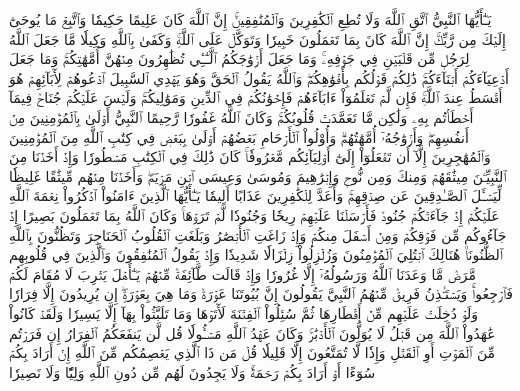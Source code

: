 يَـٰٓأَيُّهَا ٱلنَّبِيُّ ٱتَّقِ ٱللَّهَ وَلَا تُطِعِ ٱلۡكَٰفِرِينَ وَٱلۡمُنَٰفِقِينَۚ إِنَّ ٱللَّهَ كَانَ عَلِيمًا حَكِيمٗا
وَٱتَّبِعۡ مَا يُوحَىٰٓ إِلَيۡكَ مِن رَّبِّكَۚ إِنَّ ٱللَّهَ كَانَ بِمَا تَعۡمَلُونَ خَبِيرٗا
وَتَوَكَّلۡ عَلَى ٱللَّهِۚ وَكَفَىٰ بِٱللَّهِ وَكِيلٗا
مَّا جَعَلَ ٱللَّهُ لِرَجُلٖ مِّن قَلۡبَيۡنِ فِي جَوۡفِهِۦۚ وَمَا جَعَلَ أَزۡوَٰجَكُمُ ٱلَّـٰٓـِٔي تُظَٰهِرُونَ مِنۡهُنَّ أُمَّهَٰتِكُمۡۚ وَمَا جَعَلَ أَدۡعِيَآءَكُمۡ أَبۡنَآءَكُمۡۚ ذَٰلِكُمۡ قَوۡلُكُم بِأَفۡوَٰهِكُمۡۖ وَٱللَّهُ يَقُولُ ٱلۡحَقَّ وَهُوَ يَهۡدِي ٱلسَّبِيلَ
ٱدۡعُوهُمۡ لِأٓبَآئِهِمۡ هُوَ أَقۡسَطُ عِندَ ٱللَّهِۚ فَإِن لَّمۡ تَعۡلَمُوٓاْ ءَابَآءَهُمۡ فَإِخۡوَٰنُكُمۡ فِي ٱلدِّينِ وَمَوَٰلِيكُمۡۚ وَلَيۡسَ عَلَيۡكُمۡ جُنَاحٞ فِيمَآ أَخۡطَأۡتُم بِهِۦ وَلَٰكِن مَّا تَعَمَّدَتۡ قُلُوبُكُمۡۚ وَكَانَ ٱللَّهُ غَفُورٗا رَّحِيمًا
ٱلنَّبِيُّ أَوۡلَىٰ بِٱلۡمُؤۡمِنِينَ مِنۡ أَنفُسِهِمۡۖ وَأَزۡوَٰجُهُۥٓ أُمَّهَٰتُهُمۡۗ وَأُوْلُواْ ٱلۡأَرۡحَامِ بَعۡضُهُمۡ أَوۡلَىٰ بِبَعۡضٖ فِي كِتَٰبِ ٱللَّهِ مِنَ ٱلۡمُؤۡمِنِينَ وَٱلۡمُهَٰجِرِينَ إِلَّآ أَن تَفۡعَلُوٓاْ إِلَىٰٓ أَوۡلِيَآئِكُم مَّعۡرُوفٗاۚ كَانَ ذَٰلِكَ فِي ٱلۡكِتَٰبِ مَسۡطُورٗا
وَإِذۡ أَخَذۡنَا مِنَ ٱلنَّبِيِّـۧنَ مِيثَٰقَهُمۡ وَمِنكَ وَمِن نُّوحٖ وَإِبۡرَٰهِيمَ وَمُوسَىٰ وَعِيسَى ٱبۡنِ مَرۡيَمَۖ وَأَخَذۡنَا مِنۡهُم مِّيثَٰقًا غَلِيظٗا
لِّيَسۡـَٔلَ ٱلصَّـٰدِقِينَ عَن صِدۡقِهِمۡۚ وَأَعَدَّ لِلۡكَٰفِرِينَ عَذَابًا أَلِيمٗا
يَـٰٓأَيُّهَا ٱلَّذِينَ ءَامَنُواْ ٱذۡكُرُواْ نِعۡمَةَ ٱللَّهِ عَلَيۡكُمۡ إِذۡ جَآءَتۡكُمۡ جُنُودٞ فَأَرۡسَلۡنَا عَلَيۡهِمۡ رِيحٗا وَجُنُودٗا لَّمۡ تَرَوۡهَاۚ وَكَانَ ٱللَّهُ بِمَا تَعۡمَلُونَ بَصِيرًا
إِذۡ جَآءُوكُم مِّن فَوۡقِكُمۡ وَمِنۡ أَسۡفَلَ مِنكُمۡ وَإِذۡ زَاغَتِ ٱلۡأَبۡصَٰرُ وَبَلَغَتِ ٱلۡقُلُوبُ ٱلۡحَنَاجِرَ وَتَظُنُّونَ بِٱللَّهِ ٱلظُّنُونَا۠
هُنَالِكَ ٱبۡتُلِيَ ٱلۡمُؤۡمِنُونَ وَزُلۡزِلُواْ زِلۡزَالٗا شَدِيدٗا
وَإِذۡ يَقُولُ ٱلۡمُنَٰفِقُونَ وَٱلَّذِينَ فِي قُلُوبِهِم مَّرَضٞ مَّا وَعَدَنَا ٱللَّهُ وَرَسُولُهُۥٓ إِلَّا غُرُورٗا
وَإِذۡ قَالَت طَّآئِفَةٞ مِّنۡهُمۡ يَـٰٓأَهۡلَ يَثۡرِبَ لَا مُقَامَ لَكُمۡ فَٱرۡجِعُواْۚ وَيَسۡتَـٔۡذِنُ فَرِيقٞ مِّنۡهُمُ ٱلنَّبِيَّ يَقُولُونَ إِنَّ بُيُوتَنَا عَوۡرَةٞ وَمَا هِيَ بِعَوۡرَةٍۖ إِن يُرِيدُونَ إِلَّا فِرَارٗا
وَلَوۡ دُخِلَتۡ عَلَيۡهِم مِّنۡ أَقۡطَارِهَا ثُمَّ سُئِلُواْ ٱلۡفِتۡنَةَ لَأٓتَوۡهَا وَمَا تَلَبَّثُواْ بِهَآ إِلَّا يَسِيرٗا
وَلَقَدۡ كَانُواْ عَٰهَدُواْ ٱللَّهَ مِن قَبۡلُ لَا يُوَلُّونَ ٱلۡأَدۡبَٰرَۚ وَكَانَ عَهۡدُ ٱللَّهِ مَسۡـُٔولٗا
قُل لَّن يَنفَعَكُمُ ٱلۡفِرَارُ إِن فَرَرۡتُم مِّنَ ٱلۡمَوۡتِ أَوِ ٱلۡقَتۡلِ وَإِذٗا لَّا تُمَتَّعُونَ إِلَّا قَلِيلٗا
قُلۡ مَن ذَا ٱلَّذِي يَعۡصِمُكُم مِّنَ ٱللَّهِ إِنۡ أَرَادَ بِكُمۡ سُوٓءًا أَوۡ أَرَادَ بِكُمۡ رَحۡمَةٗۚ وَلَا يَجِدُونَ لَهُم مِّن دُونِ ٱللَّهِ وَلِيّٗا وَلَا نَصِيرٗا

